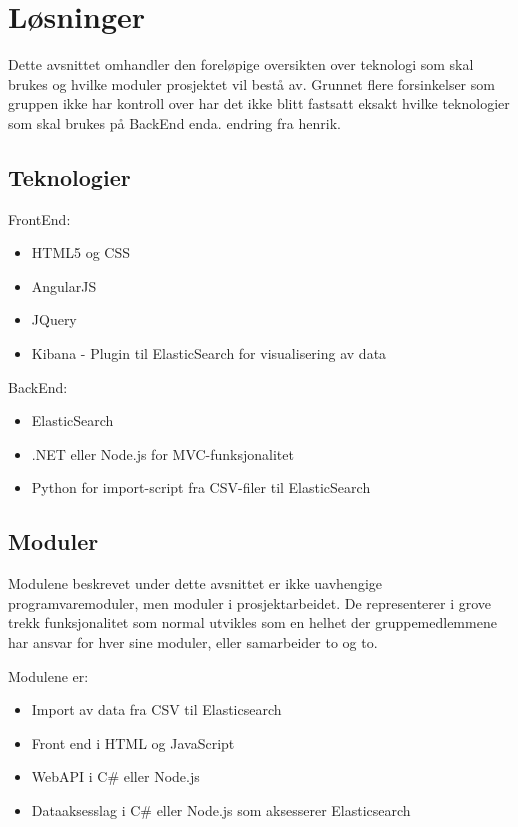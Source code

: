 \chapter{Løsninger}
Dette avsnittet omhandler den foreløpige oversikten over teknologi som skal brukes og hvilke moduler prosjektet vil bestå av. Grunnet flere forsinkelser som gruppen ikke har kontroll over har det ikke blitt fastsatt eksakt hvilke teknologier som skal brukes på BackEnd enda. endring fra henrik.


\section{Teknologier}
FrontEnd:
\begin{itemize}
\item HTML5 og CSS
\item AngularJS
\item JQuery
\item Kibana - Plugin til ElasticSearch for visualisering av data
\end{itemize}

BackEnd:
\begin{itemize}
\item ElasticSearch
\item .NET eller Node.js for MVC-funksjonalitet
\item Python for import-script fra CSV-filer til ElasticSearch
\end{itemize}

\section{Moduler}
Modulene beskrevet under dette avsnittet er ikke uavhengige programvaremoduler, men moduler i prosjektarbeidet. De representerer i grove trekk funksjonalitet som normal utvikles som en helhet der gruppemedlemmene har ansvar for hver sine moduler, eller samarbeider to og to.

Modulene er:
\begin{itemize}
\item Import av data fra CSV til Elasticsearch
\item Front end i HTML og JavaScript
\item WebAPI i C\# eller Node.js
\item Dataaksesslag i C\# eller Node.js som aksesserer Elasticsearch
\end{itemize}

